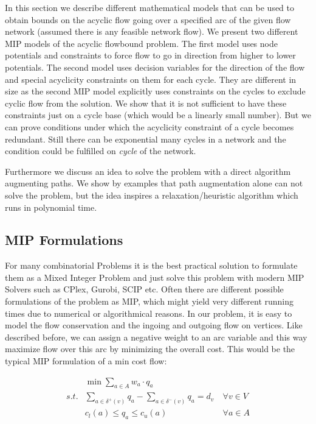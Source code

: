 In this section we describe different mathematical models that can be used to obtain bounds on the acyclic flow going 
over a specified arc of the given flow network (assumed there is any feasible network flow). We present two different 
MIP models of the acyclic flowbound problem. The first model uses node potentials and constraints to force flow to 
go in direction from higher to lower potentials. The second model uses decision variables for the direction of the 
flow and special acyclicity constraints on them for each cycle. They are different in size as the second MIP model 
explicitly uses constraints on the cycles to exclude cyclic flow from the solution. We show that it is not sufficient 
to have these constraints just on a cycle base (which would be a linearly small number). But we can prove 
conditions under which the acyclicity constraint of a cycle becomes redundant. Still there can be exponential many 
cycles in a network and the condition could be fulfilled on \textit{cycle} of the network. 

Furthermore we discuss an idea to solve the problem with a direct algorithm augmenting paths. We show by examples that 
path augmentation alone can not solve the problem, but the idea inspires a relaxation/heuristic algorithm which runs in 
polynomial time.


\subsection{MIP Formulations}
For many combinatorial Problems it is the best practical solution to formulate them as a Mixed Integer Problem and just 
solve this problem with modern MIP Solvers such as CPlex, Gurobi, SCIP etc. Often there are different possible 
formulations of the problem as 
MIP, which might yield very different running times due to numerical or algorithmical reasons. In our problem, it is 
easy to model the flow conservation and the ingoing and outgoing flow on vertices. Like described before, we can assign 
a negative weight to an arc variable and this way maximize flow over this arc by minimizing the overall cost. This 
would be the typical MIP formulation of a min cost flow:

\begin{align*}
  &\min \sum_{a\in A} w_a\cdot q_a  \\
 s.t. & \sum_{a\in \delta^+(v)}q_a - \sum_{a\in\delta^- (v)}q_a = d_v\ &\forall v\in V \\
  & c_l(a)\le q_a \le c_u(a) & \forall a\in A
\end{align*}

